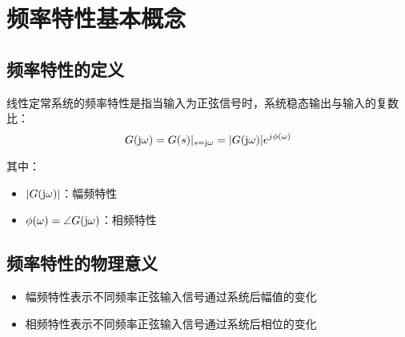 \section{频率特性基本概念}

\subsection{频率特性的定义}
线性定常系统的频率特性是指当输入为正弦信号时，系统稳态输出与输入的复数比：
\[G(\mathrm{j}\omega) = G(s)|_{s=\mathrm{j}\omega} = |G(\mathrm{j}\omega)|e^{j\phi(\omega)}\]

其中：
\begin{itemize}
    \item $|G(\mathrm{j}\omega)|$：幅频特性
    \item $\phi(\omega) = \angle G(\mathrm{j}\omega)$：相频特性
\end{itemize}

\subsection{频率特性的物理意义}
\begin{itemize}
    \item 幅频特性表示不同频率正弦输入信号通过系统后幅值的变化
    \item 相频特性表示不同频率正弦输入信号通过系统后相位的变化
\end{itemize}
